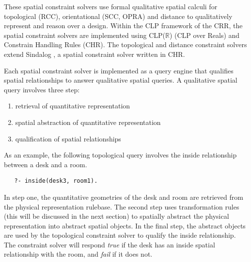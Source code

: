 \documentclass[12pt]{ucthesis}
\begin{document}
These spatial constraint solvers use formal qualitative spatial calculi for topological (RCC), orientational (SCC, OPRA) and distance to qualitatively represent and reason over a design. Within the CLP framework of the CRR, the spatial constraint solvers are implemented using CLP($\mathbb{R}$) (CLP over Reals) and Constrain Handling Rules (CHR). The topological and distance constraint solvers extend Sindalog \cite{Almendros-Jimenez}, a spatial constraint solver written in CHR.

Each spatial constraint solver is implemented as a query engine that qualifies spatial relationships to answer qualitative spatial queries.  A qualitative spatial query involves three step:
\begin{enumerate}
\item retrieval of quantitative representation 
\item spatial abstraction of quantitative representation
\item qualification of spatial relationships
\end{enumerate}  
As an example, the following topological query involves the inside relationship between a desk and a room. 
\begin{verbatim}
   ?- inside(desk3, room1).
\end{verbatim} In step one, the quantitative geometries of the desk and room are retrieved from the physical representation rulebase. The second step uses transformation rules (this will be discussed in the next section) to spatially abstract the physical representation into abstract spatial objects. In the final step, the abstract objects are used by the topological constraint solver to qualify the inside relationship. The constraint solver will respond \emph{true} if the desk has an inside spatial relationship with the room, and \emph{fail} if it does not.   

\end{document}
